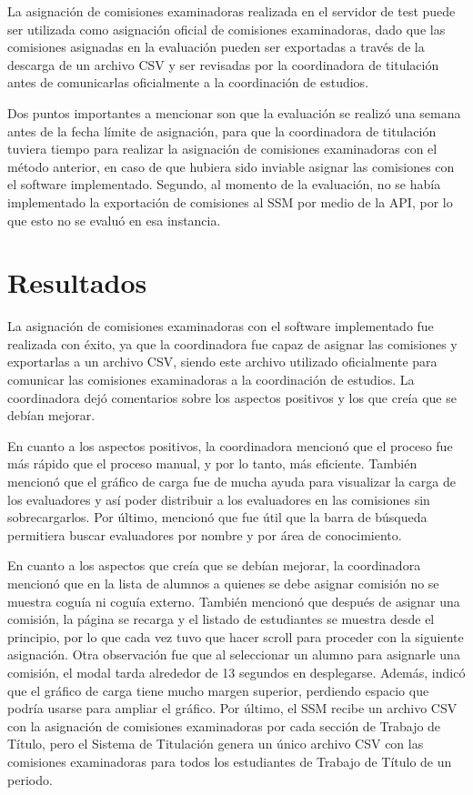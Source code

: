 La asignación de comisiones examinadoras realizada en el servidor de test puede ser
utilizada como asignación oficial de comisiones examinadoras, dado que las comisiones
asignadas en la evaluación pueden ser exportadas a través de la descarga de un archivo
CSV y ser revisadas por la coordinadora de titulación antes de comunicarlas oficialmente
a la coordinación de estudios.

Dos puntos importantes a mencionar son que la evaluación se realizó una semana antes
de la fecha límite de asignación, para que la coordinadora de titulación tuviera tiempo
para realizar la asignación de comisiones examinadoras con el método anterior, en caso de
que hubiera sido inviable asignar las comisiones con el software implementado. Segundo,
al momento de la evaluación, no se había implementado la exportación de comisiones al SSM
por medio de la API, por lo que esto no se evaluó en esa instancia.


\section{Resultados}
La asignación de comisiones examinadoras con el software implementado fue realizada con éxito,
ya que la coordinadora fue capaz de asignar las comisiones y exportarlas a un archivo CSV,
siendo este archivo utilizado oficialmente para comunicar las comisiones examinadoras
a la coordinación de estudios. La coordinadora dejó comentarios sobre los aspectos positivos
y los que creía que se debían mejorar.

En cuanto a los aspectos positivos, la coordinadora mencionó que el proceso fue más rápido
que el proceso manual, y por lo tanto, más eficiente. También mencionó que el gráfico de
carga fue de mucha ayuda para visualizar la carga de los evaluadores y así poder distribuir
a los evaluadores en las comisiones sin sobrecargarlos. Por último, mencionó que fue útil
que la barra de búsqueda permitiera buscar evaluadores por nombre y por área de conocimiento.

En cuanto a los aspectos que creía que se debían mejorar, la coordinadora mencionó que en
la lista de alumnos a quienes se debe asignar comisión no se muestra coguía ni coguía externo.
También mencionó que después de asignar una comisión, la página se recarga y el listado de
estudiantes se muestra desde el principio, por lo que cada vez tuvo que hacer scroll para
proceder con la siguiente asignación. Otra observación fue que al seleccionar un alumno
para asignarle una comisión, el modal tarda alrededor de 13 segundos en desplegarse.
Además, indicó que el gráfico de carga tiene mucho margen superior, perdiendo espacio
que podría usarse para ampliar el gráfico. Por último, el SSM recibe un archivo CSV
con la asignación de comisiones examinadoras por cada sección de Trabajo de Título,
pero el Sistema de Titulación genera un único archivo CSV con las comisiones examinadoras
para todos los estudiantes de Trabajo de Título de un periodo.


